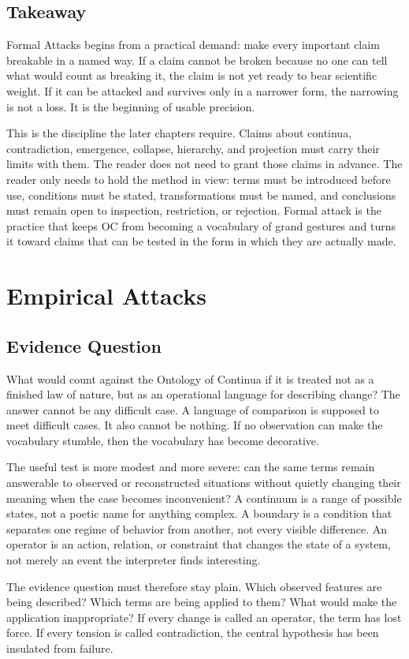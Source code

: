 \documentclass[11pt,a4paper,openany]{book}
\begin{document}
\subsection{Takeaway}
Formal Attacks begins from a practical demand: make every important claim breakable in a named way. If a claim cannot be broken because no one can tell what would count as breaking it, the claim is not yet ready to bear scientific weight. If it can be attacked and survives only in a narrower form, the narrowing is not a loss. It is the beginning of usable precision. \cite{kadanoff_scaling,wilson_renormalization}\par
This is the discipline the later chapters require. Claims about continua, contradiction, emergence, collapse, hierarchy, and projection must carry their limits with them. The reader does not need to grant those claims in advance. The reader only needs to hold the method in view: terms must be introduced before use, conditions must be stated, transformations must be named, and conclusions must remain open to inspection, restriction, or rejection. Formal attack is the practice that keeps OC from becoming a vocabulary of grand gestures and turns it toward claims that can be tested in the form in which they are actually made.\par
\section{Empirical Attacks}
\subsection{Evidence Question}
What would count against the Ontology of Continua if it is treated not as a finished law of nature, but as an operational language for describing change? The answer cannot be any difficult case. A language of comparison is supposed to meet difficult cases. It also cannot be nothing. If no observation can make the vocabulary stumble, then the vocabulary has become decorative. \cite{wilson_renormalization,landau_stat_physics}\par
The useful test is more modest and more severe: can the same terms remain answerable to observed or reconstructed situations without quietly changing their meaning when the case becomes inconvenient? A continuum is a range of possible states, not a poetic name for anything complex. A boundary is a condition that separates one regime of behavior from another, not every visible difference. An operator is an action, relation, or constraint that changes the state of a system, not merely an event the interpreter finds interesting.\par
The evidence question must therefore stay plain. Which observed features are being described? Which terms are being applied to them? What would make the application inappropriate? If every change is called an operator, the term has lost force. If every tension is called contradiction, the central hypothesis has been insulated from failure.\par
\end{document}
